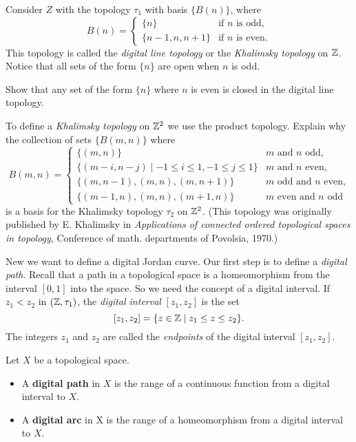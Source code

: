 \begin{activity} \label{act:digital_Jordan_curve} Consider $Z$ with the topology $\tau_1$ with basis $\{B(n)\}$, where 
\[B(n) = \begin{cases} \{n\}	&\text{if $n$ is odd}, \\ \{n-1,n,n+1\}	&\text{if $n$ is even}. \end{cases}\]
This topology is called the \emph{digital line topology} or the \emph{Khalimsky topology} on $\mathbb{Z}$. Notice that all sets of the form $\{n\}$ are open when $n$ is odd. 

\ba

\item Show that any set of the form $\{n\}$ where $n$ is even is closed in the digital line topology. 

\item To define a \emph{Khalimsky topology} on $\mathbb{Z}^2$ we use the product topology.  Explain why the collection of sets $\{B(m,n)\}$ where 
\[B(m,n) = \begin{cases} \{(m,n)\}  & m \text{ and } n \text{ odd,} \\
\{(m-i,n-j) \mid -1 \leq i \leq 1, -1 \leq j \leq 1\} &m \text{ and } n \text{ even,} \\
\{(m,n-1), (m,n), (m,n+1)\} &m \text{ odd and } n \text{ even,} \\
\{(m-1,n), (m,n), (m+1,n)\} &m \text{ even and } n \text{ odd} 
\end{cases}\]
is a basis for the Khalimsky topology $\tau_2$ on $\mathbb{Z}^2$. (This topology was originally published by  E. Khalimsky in \emph{Applications of connected ordered topological spaces in topology}, Conference of math. departments of Povolsia, 1970.)

\item New we want to define a digital Jordan curve. Our first step is to define a \emph{digital path}. Recall that a path in a topological space is a homeomorphism from the interval $[0,1]$ into the space. So we need the concept of a digital interval. If $z_1 < z_2$ in $(\mathbb{Z}, \tau_1)$, the \emph{digital interval} $[z_1,z_2]$ is the set
\[[z_1, z_2] = \{z \in \mathbb{Z} \mid z_1 \leq z \leq z_2\}.\]
The integers $z_1$ and $z_2$ are called the \emph{endpoints} of the digital interval $[z_1,z_2]$.  

\begin{definition} Let $X$ be a topological space.
\begin{itemize}
\item A \textbf{digital path} in $X$ is the range of a continuous function from a digital interval to $X$.
\item A \textbf{digital arc} in X is the range of a homeomorphism from a digital interval to $X$.
\end{itemize}
\end{definition}


\end{activity}
